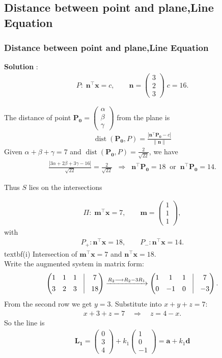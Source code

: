\documentclass{beamer}
\theoremstyle{remark}
\providecommand{\norm}[1]{\lVert#1\rVert}
\newcommand{\myvec}[1]{\ensuremath{\begin{pmatrix}#1\end{pmatrix}}}
\let\vec\mathbf
\numberwithin{equation}{section}
\begin{document}
\subsection{Distance between point and plane,Line Equation}
\begin{frame}
\frametitle{Distance between point and plane,Line Equation}
\textbf{Solution} :
\begin{align}
P:\; \vec{n}^\top \vec{x} = c,\qquad \vec{n}=\myvec {3\\2\\3}\;c=16.
\end{align}

The distance of point $\vec{P_0}=\myvec{\alpha\\ \beta\\ \gamma}$ from the plane is
\begin{align}
\operatorname{dist}(\vec{P_0},P)=\frac{|\vec{n}^\top \vec{P_0} - c|}{\norm{\vec{n}}}
\end{align}
Given $\alpha+\beta+\gamma=7$ and $\operatorname{dist}(\vec{P_0},P)=\tfrac{2}{\sqrt{22}}$, we have
\begin{align}
\frac{|3\alpha+2\beta+3\gamma-16|}{\sqrt{22}}=\frac{2}{\sqrt{22}}
\;\;\Longrightarrow\;\; \vec{n}^\top \vec{P_0}=18 \;\;\text{or}\;\; \vec{n}^\top \vec{P_0}=14.
\end{align}

Thus $S$ lies on the intersections
\end{frame}
\begin{frame}
\begin{align}
\Pi:\; \vec{m}^\top \vec{x}=7,\qquad \vec{m}=\myvec{1\\1\\1},
\end{align}
with
\begin{align}
P_+: \vec{n}^\top \vec{x}=18,\qquad P_-:\vec{n}^\top \vec{x}=14.
\end{align}
textbf{(i) Intersection of $\vec{m}^\top \vec{x}=7$ and $\vec{n}^\top \vec{x}=18$.}\\
Write the augmented system in matrix form:
\begin{align}
\myvec
{1 & 1 & 1 &\vrule& 7\\[4pt]
3 & 2 & 3 &\vrule& 18} \xrightarrow{R_2 \longrightarrow R_2-3R_1}
\myvec{
1 & 1 & 1 &\vrule& 7\\[4pt]
0 & -1 & 0 &\vrule& -3}.
\end{align}
From the second row we get  $y=3$. Substitute into $x+y+z=7$:
\begin{align}
x+3+z=7 \quad\Longrightarrow\quad z=4-x.
\end{align}
So the line is
\begin{align}
\vec{L_1} = \myvec{0\\3\\4} + k_1\myvec{1\\0\\-1} = \vec{a} + k_1 \vec{d} 
\end{align}
\end{frame}
\end{document}
